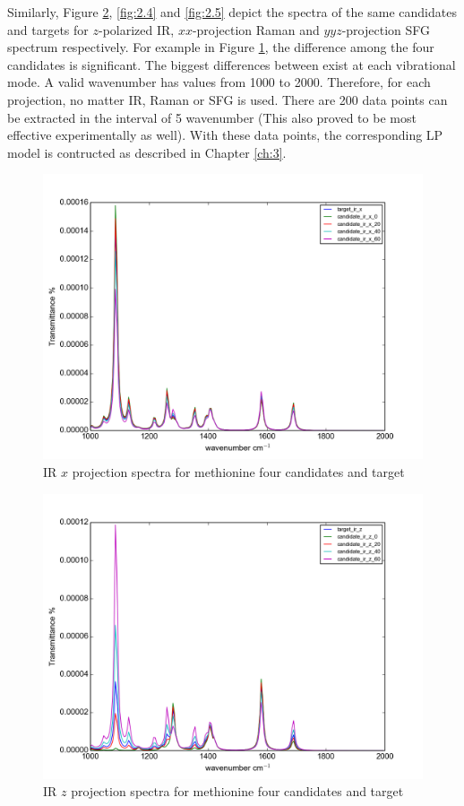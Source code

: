 Similarly, Figure \ref{fig:2.3}, \ref{fig:2.4} and \ref{fig:2.5} depict the spectra of the same candidates and targets for $z$-polarized IR, $xx$-projection Raman and $yyz$-projection SFG spectrum respectively. For example in Figure \ref{fig:2.2}, the difference among the four candidates is significant. The biggest differences between exist at each vibrational mode. A valid wavenumber has values from 1000 to 2000. Therefore, for each projection, no matter IR, Raman or SFG is used. There are 200 data points can be extracted in the interval of 5 wavenumber (This also proved to be most effective experimentally as well).  With these data points, the corresponding LP model is contructed as described in Chapter \ref{ch:3}.\\

\begin{figure}[!ht]
\centering
\includegraphics[scale=0.5]{Figures/Met_candidates_plotting_ir_x.png}
\caption{IR $x$ projection spectra for methionine four candidates and target} \label{fig:2.2}
\end{figure}

\begin{figure}[!ht]
\centering
\includegraphics[scale=0.5]{Figures/Met_candidates_plotting_ir_z.png}
\caption{IR $z$ projection spectra for methionine four candidates and target} \label{fig:2.3}
\end{figure}

